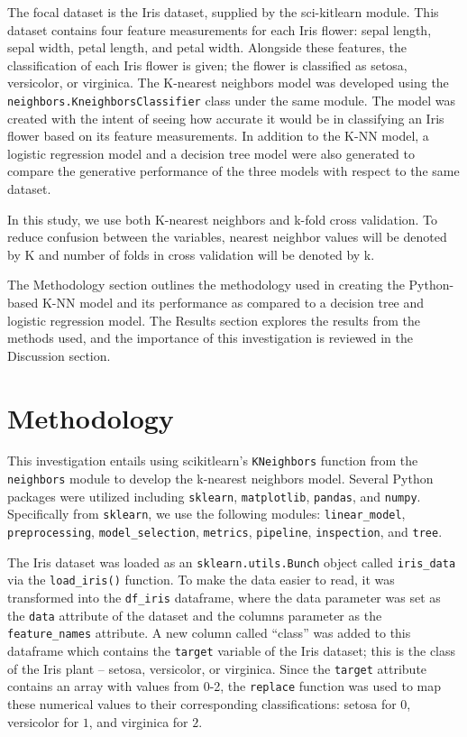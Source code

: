 \documentclass[journal]{IEEEtran}
\begin{document}
The focal dataset is the Iris dataset, supplied by the sci-kitlearn module. This dataset contains four feature measurements for each Iris flower: sepal length, sepal width, petal length, and petal width. Alongside these features, the classification of each Iris flower is given; the flower is classified as setosa, versicolor, or virginica. The K-nearest neighbors model was developed using the \lstinline{neighbors.KneighborsClassifier} class under the same module. The model was created with the intent of seeing how accurate it would be in classifying an Iris flower based on its feature measurements. In addition to the K-NN model, a logistic regression model and a decision tree model were also generated to compare the generative performance of the three models with respect to the same dataset. 

In this study, we use both K-nearest neighbors and k-fold cross validation. To reduce confusion between the variables, nearest neighbor values will be denoted by K and number of folds in cross validation will be denoted by k.

The Methodology section outlines the methodology used in creating the Python-based K-NN model and its performance as compared to a decision tree and logistic regression model. The Results section explores the results from the methods used, and the importance of this investigation is reviewed in the Discussion section.


\section{Methodology}
This investigation entails using scikitlearn’s \lstinline{KNeighbors} function from the \lstinline{neighbors} module to develop the k-nearest neighbors model. Several Python packages were utilized including \lstinline{sklearn}, \lstinline{matplotlib}, \lstinline{pandas}, and \lstinline{numpy}. Specifically from \lstinline{sklearn}, we use the following modules: \lstinline{linear_model}, \lstinline{preprocessing}, \lstinline{model_selection}, \lstinline{metrics}, \lstinline{pipeline}, \lstinline{inspection}, and \lstinline{tree}. 

The Iris dataset was loaded as an \lstinline{sklearn.utils.Bunch} object called \lstinline{iris_data} via the \lstinline{load_iris()} function. To make the data easier to read, it was transformed into the \lstinline{df_iris} dataframe, where the data parameter was set as the \lstinline{data} attribute of the dataset and the columns parameter as the \lstinline{feature_names} attribute. A new column called “class” was added to this dataframe which contains the \lstinline{target} variable of the Iris dataset; this is the class of the Iris plant – setosa, versicolor, or virginica. Since the \lstinline{target} attribute contains an array with values from 0-2, the \lstinline{replace} function was used to map these numerical values to their corresponding classifications: setosa for \(0\), versicolor for \(1\), and virginica for \(2\). 
\end{document}
